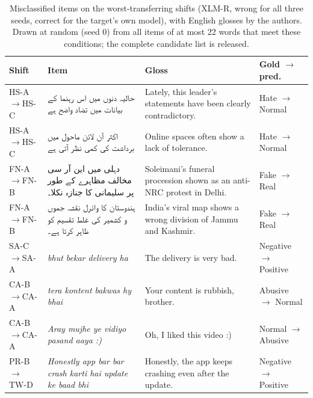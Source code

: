 \documentclass[acmsmall,screen]{acmart}
\newcommand{\ur}[1]{{\urdufont\beginR #1\endR}}
\begin{document}
\begin{table}[t]\centering\small\renewcommand{\arraystretch}{1.3}
\caption{Misclassified items on the worst-transferring shifts (XLM-R, wrong for all three seeds, correct for the target's own model), with English glosses by the authors. Drawn at random (seed 0) from all items of at most 22 words that meet these conditions; the complete candidate list is released.}
\label{tab:errex}
\begin{tabularx}{\textwidth}{>{\raggedright\arraybackslash}p{2.0cm}>{\raggedright\arraybackslash}X>{\raggedright\arraybackslash}X>{\raggedright\arraybackslash}p{1.9cm}}
\toprule
Shift & Item & Gloss & Gold $\rightarrow$ pred. \\
\midrule
HS-A$\rightarrow$HS-C & \ur{حالیہ دنوں میں اس رہنما کے بیانات میں تضاد واضح ہے} & Lately, this leader's statements have been clearly contradictory. & Hate $\rightarrow$ Normal \\
HS-A$\rightarrow$HS-C & \ur{اکثر آن لائن ماحول میں برداشت کی کمی نظر آتی ہے} & Online spaces often show a lack of tolerance. & Hate $\rightarrow$ Normal \\
FN-A$\rightarrow$FN-B & \ur{دہلی میں این آر سی مخالف مظاہرے کے طور پر سلیمانی کا جنازہ نکلا۔} & Soleimani's funeral procession shown as an anti-NRC protest in Delhi. & Fake $\rightarrow$ Real \\
FN-A$\rightarrow$FN-B & \ur{ہندوستان کا وائرل نقشہ جموں و کشمیر کی غلط تقسیم کو ظاہر کرتا ہے۔} & India's viral map shows a wrong division of Jammu and Kashmir. & Fake $\rightarrow$ Real \\
SA-C$\rightarrow$SA-A & \textit{bhut bekar delivery ha} & The delivery is very bad. & Negative $\rightarrow$ Positive \\
CA-B$\rightarrow$CA-A & \textit{tera kontent bakwas hy bhai} & Your content is rubbish, brother. & Abusive $\rightarrow$ Normal \\
CA-B$\rightarrow$CA-A & \textit{Aray mujhe ye vidiyo pasand aaya :)} & Oh, I liked this video :) & Normal $\rightarrow$ Abusive \\
PR-B$\rightarrow$TW-D & \textit{Honestly app bar bar crash karti hai update ke baad bhi} & Honestly, the app keeps crashing even after the update. & Negative $\rightarrow$ Positive \\
\bottomrule
\end{tabularx}
\end{table}

\end{document}
